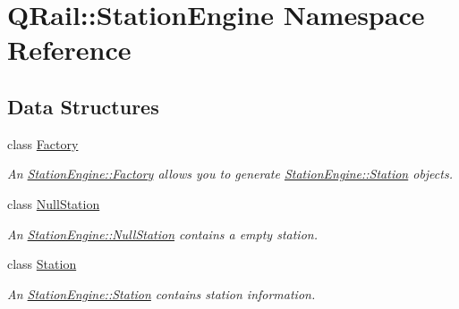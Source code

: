 \hypertarget{namespaceQRail_1_1StationEngine}{}\section{Q\+Rail\+::Station\+Engine Namespace Reference}
\label{namespaceQRail_1_1StationEngine}
\subsection*{Data Structures}
\begin{DoxyCompactItemize}
\item 
class \mbox{\hyperlink{classQRail_1_1StationEngine_1_1Factory}{Factory}}
\begin{DoxyCompactList}\small\item\em An \mbox{\hyperlink{classQRail_1_1StationEngine_1_1Factory}{Station\+Engine\+::\+Factory}} allows you to generate \mbox{\hyperlink{classQRail_1_1StationEngine_1_1Station}{Station\+Engine\+::\+Station}} objects. \end{DoxyCompactList}\item 
class \mbox{\hyperlink{classQRail_1_1StationEngine_1_1NullStation}{Null\+Station}}
\begin{DoxyCompactList}\small\item\em An \mbox{\hyperlink{classQRail_1_1StationEngine_1_1NullStation}{Station\+Engine\+::\+Null\+Station}} contains a empty station. \end{DoxyCompactList}\item 
class \mbox{\hyperlink{classQRail_1_1StationEngine_1_1Station}{Station}}
\begin{DoxyCompactList}\small\item\em An \mbox{\hyperlink{classQRail_1_1StationEngine_1_1Station}{Station\+Engine\+::\+Station}} contains station information. \end{DoxyCompactList}\end{DoxyCompactItemize}
